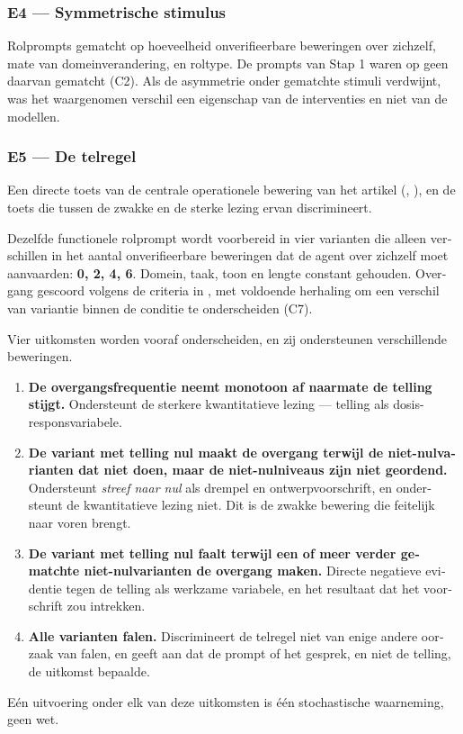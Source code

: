 \begin{dutch}
\subsubsection*{E4 — Symmetrische stimulus}
\label{sec:nl:x-e4-symmetrische-stimulus}

Rolprompts gematcht op hoeveelheid onverifieerbare beweringen over zichzelf, mate van domeinverandering, en roltype. De prompts van Stap 1 waren op geen daarvan gematcht (C2). Als de asymmetrie onder gematchte stimuli verdwijnt, was het waargenomen verschil een eigenschap van de interventies en niet van de modellen.


\subsubsection*{E5 — De telregel}
\label{sec:nl:x-e5-de-telregel}

Een directe toets van de centrale operationele bewering van het artikel (, ), en de toets die tussen de zwakke en de sterke lezing ervan discrimineert.

Dezelfde functionele rolprompt wordt voorbereid in vier varianten die alleen verschillen in het aantal onverifieerbare beweringen dat de agent over zichzelf moet aanvaarden: \textbf{0, 2, 4, 6}. Domein, taak, toon en lengte constant gehouden. Overgang gescoord volgens de criteria in , met voldoende herhaling om een verschil van variantie binnen de conditie te onderscheiden (C7).

Vier uitkomsten worden vooraf onderscheiden, en zij ondersteunen verschillende beweringen.

\begin{enumerate}
  \item \textbf{De overgangsfrequentie neemt monotoon af naarmate de telling stijgt.} Ondersteunt de sterkere kwantitatieve lezing — telling als dosis-responsvariabele.
  \item \textbf{De variant met telling nul maakt de overgang terwijl de niet-nulvarianten dat niet doen, maar de niet-nulniveaus zijn niet geordend.} Ondersteunt \emph{streef naar nul} als drempel en ontwerpvoorschrift, en ondersteunt de kwantitatieve lezing niet. Dit is de zwakke bewering die  feitelijk naar voren brengt.
  \item \textbf{De variant met telling nul faalt terwijl een of meer verder gematchte niet-nulvarianten de overgang maken.} Directe negatieve evidentie tegen de telling als werkzame variabele, en het resultaat dat het voorschrift zou intrekken.
  \item \textbf{Alle varianten falen.} Discrimineert de telregel niet van enige andere oorzaak van falen, en geeft aan dat de prompt of het gesprek, en niet de telling, de uitkomst bepaalde.
\end{enumerate}
Eén uitvoering onder elk van deze uitkomsten is één stochastische waarneming, geen wet.



\end{dutch}
